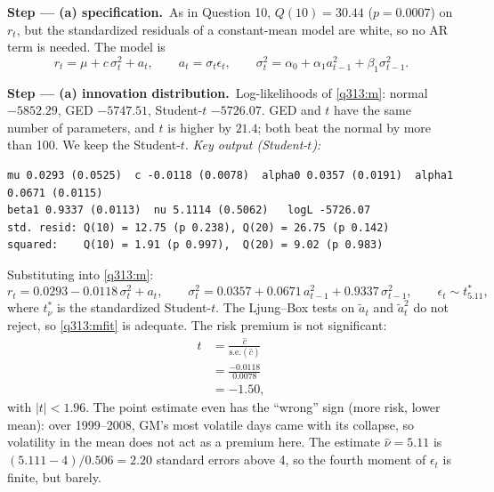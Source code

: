 \documentclass[11pt,a4paper]{article}
\newcommand{\passo}[2]{\par\smallskip\noindent\textbf{Step --- #1.}~#2}
\begin{document}
\begin{sol}
\passo{(a) specification}{As in Question 10, $Q(10)=30.44$ ($p=0.0007$) on $r_t$, but the standardized
residuals of a constant-mean model are white, so no AR term is needed. The model is}
\begin{equation}\label{q313:m} r_t=\mu+c\,\sigma_t^2+a_t,\qquad a_t=\sigma_t\epsilon_t,\qquad \sigma_t^2=\alpha_0+\alpha_1a_{t-1}^2+\beta_1\sigma_{t-1}^2 . \end{equation}
\passo{(a) innovation distribution}{Log-likelihoods of \eqref{q313:m}: normal $-5852.29$, GED $-5747.51$,
Student-$t$ $-5726.07$. GED and $t$ have the same number of parameters, and $t$ is higher by $21.4$; both
beat the normal by more than 100. We keep the Student-$t$.}
\noindent\textit{Key output (Student-$t$):}
\begingroup\footnotesize
\begin{verbatim}
mu 0.0293 (0.0525)  c -0.0118 (0.0078)  alpha0 0.0357 (0.0191)  alpha1 0.0671 (0.0115)
beta1 0.9337 (0.0113)  nu 5.1114 (0.5062)   logL -5726.07
std. resid: Q(10) = 12.75 (p 0.238), Q(20) = 26.75 (p 0.142)
squared:    Q(10) = 1.91 (p 0.997),  Q(20) = 9.02 (p 0.983)
\end{verbatim}
\endgroup
Substituting into \eqref{q313:m}:
\begin{equation}\label{q313:mfit} r_t=0.0293-0.0118\,\sigma_t^2+a_t,\qquad \sigma_t^2=0.0357+0.0671\,a_{t-1}^2+0.9337\,\sigma_{t-1}^2,\qquad \epsilon_t\sim t^*_{5.11}, \end{equation}
where $t^*_\nu$ is the standardized Student-$t$. The Ljung--Box tests on $\tilde a_t$ and $\tilde a_t^2$ do not
reject, so \eqref{q313:mfit} is adequate. The risk premium is not significant:
\begin{align*}
t &= \frac{\hat c}{\text{s.e.}(\hat c)}\\
&= \frac{-0.0118}{0.0078}\\
&= -1.50 ,
\end{align*}
with $|t|<1.96$. The point estimate even has the ``wrong'' sign (more risk, lower mean): over 1999--2008, GM's
most volatile days came with its collapse, so volatility in the mean does not act as a premium here.
The estimate $\hat\nu=5.11$ is $(5.111-4)/0.506=2.20$ standard errors above 4, so the fourth moment of $\epsilon_t$
is finite, but barely.


\end{sol}
\end{document}
